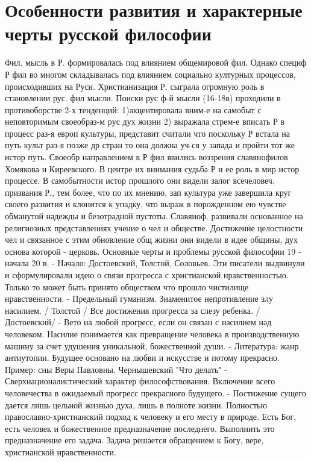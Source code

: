 \documentclass[12pt]{article}
\begin{document}
\section{Особенности развития и характерные черты русской философии}
Фил. мысль в Р. формировалась под влиянием общемировой фил. Однако специф Р фил во многом складывалась
под влиянием социально културных процессов, происходивших на Руси. Христианизация Р. сыграла огромную
роль в становлении рус. фил мысли. Поиски рус ф-й мысли (16-18в) проходили в противоборстве 2-х
тенденций: 1)акцентировала вним-е на самобыт с неповторимым своеобраз-м рус дух жизни 2) выражала стрем-е вписать Р в процесс раз-я европ культуры, представит считали что поскольку Р встала на путь культ раз-я
позже др стран то она должна уч-ся у запада и пройти тот же истор путь. Своеобр направлением в Р фил
явились воззрения славянофилов Хомякова и Киреевского. В центре их внимания судьба Р и ее роль в мир
истор процессе. В самобытности истор прошлого они видели залог всечеловеч. призвания Р., тем более, что по
их мнению, зап культура уже завершила круг своего развития и клонится к упадку, что выраж в порожденном
ею чувстве обманутой надежды и безотрадной пустоты. Славяноф. развивали основанное на религиозных
представлениях учение о чел и обществе. Достижение целостности чел и связанное с этим обновление общ
жизни они видели в идее общины, дух основа которой - церковь. 
Основные черты и проблемы русской философии 19 - начала 20 в.
- Начало: Достоевский, Толстой, Соловьев.
Эти писатели выдвинули и сформулировали идею о связи прогресса с христианской нравственностью. Только
то может быть принято обществом что прошло чистилище нравственности.
- Предельный гуманизм.
Знаменитое непротивление злу насилием. / Толстой /
Все достижения прогресса за слезу ребенка. / Достоевский/ 
- Вето на любой прогресс, если он связан с насилием над человеком.
Насилие понимается как превращение человека в производственную машину за счет удушения уникальной,
божественной души.
- Литература: жанр антиутопии.
Будущее основано на любви и искусстве и потому прекрасно. Пример: сны Веры Павловны. Чернышевский
"Что делать"
- Сверхнационалистический характер философствования. 
Включение всего человечества в ожидаемый прогресс прекрасного будущего.
- Постижение сущего дается лишь цельной жизнью духа, лишь в полноте жизни.
Полностью православно-христианский подход к человеку и его месту в природе. Есть Бог, есть человек и
божественное предназначение последнего. Выполнить это предназначение его задача. Задача решается
обращением к Богу, вере, христианской нравственности.
\end{document}
